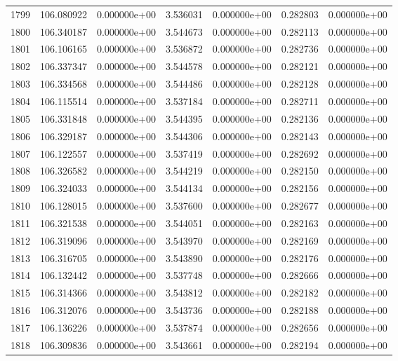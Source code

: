 \begin{tabular}{rrrrrrr}
1799 & 106.080922 &  0.000000e+00 &  3.536031 &  0.000000e+00 &    0.282803 &  0.000000e+00 \\
1800 & 106.340187 &  0.000000e+00 &  3.544673 &  0.000000e+00 &    0.282113 &  0.000000e+00 \\
1801 & 106.106165 &  0.000000e+00 &  3.536872 &  0.000000e+00 &    0.282736 &  0.000000e+00 \\
1802 & 106.337347 &  0.000000e+00 &  3.544578 &  0.000000e+00 &    0.282121 &  0.000000e+00 \\
1803 & 106.334568 &  0.000000e+00 &  3.544486 &  0.000000e+00 &    0.282128 &  0.000000e+00 \\
1804 & 106.115514 &  0.000000e+00 &  3.537184 &  0.000000e+00 &    0.282711 &  0.000000e+00 \\
1805 & 106.331848 &  0.000000e+00 &  3.544395 &  0.000000e+00 &    0.282136 &  0.000000e+00 \\
1806 & 106.329187 &  0.000000e+00 &  3.544306 &  0.000000e+00 &    0.282143 &  0.000000e+00 \\
1807 & 106.122557 &  0.000000e+00 &  3.537419 &  0.000000e+00 &    0.282692 &  0.000000e+00 \\
1808 & 106.326582 &  0.000000e+00 &  3.544219 &  0.000000e+00 &    0.282150 &  0.000000e+00 \\
1809 & 106.324033 &  0.000000e+00 &  3.544134 &  0.000000e+00 &    0.282156 &  0.000000e+00 \\
1810 & 106.128015 &  0.000000e+00 &  3.537600 &  0.000000e+00 &    0.282677 &  0.000000e+00 \\
1811 & 106.321538 &  0.000000e+00 &  3.544051 &  0.000000e+00 &    0.282163 &  0.000000e+00 \\
1812 & 106.319096 &  0.000000e+00 &  3.543970 &  0.000000e+00 &    0.282169 &  0.000000e+00 \\
1813 & 106.316705 &  0.000000e+00 &  3.543890 &  0.000000e+00 &    0.282176 &  0.000000e+00 \\
1814 & 106.132442 &  0.000000e+00 &  3.537748 &  0.000000e+00 &    0.282666 &  0.000000e+00 \\
1815 & 106.314366 &  0.000000e+00 &  3.543812 &  0.000000e+00 &    0.282182 &  0.000000e+00 \\
1816 & 106.312076 &  0.000000e+00 &  3.543736 &  0.000000e+00 &    0.282188 &  0.000000e+00 \\
1817 & 106.136226 &  0.000000e+00 &  3.537874 &  0.000000e+00 &    0.282656 &  0.000000e+00 \\
1818 & 106.309836 &  0.000000e+00 &  3.543661 &  0.000000e+00 &    0.282194 &  0.000000e+00 \\

\end{tabular}
